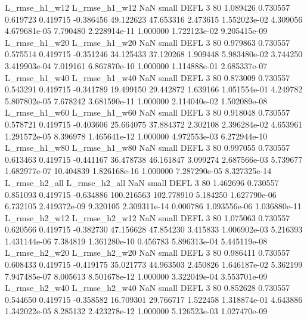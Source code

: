  L_rmse_h1_w12  L_rmse_h1_w12                   NaN      small     DEFL                 3 80 1.089426       0.730557 0.619723       0.419715   -0.386456     49.122623     47.653316     2.473615   1.552023e-02  4.309056 4.679681e-05     7.790480   2.228914e-11            1.000000    1.722123e-02        9.205415e-09
 L_rmse_h1_w20  L_rmse_h1_w20                   NaN      small     DEFL                 3 80 0.979863       0.730557 0.575514       0.419715   -0.351246     34.125433     37.120268     1.909448   5.983480e-02  3.744250 3.419903e-04     7.019161   6.867870e-10            1.000000    1.114888e-01        2.685337e-07
 L_rmse_h1_w40  L_rmse_h1_w40                   NaN      small     DEFL                 3 80 0.873009       0.730557 0.543291       0.419715   -0.341789     19.499150     29.442872     1.639166   1.051554e-01  4.249782 5.807802e-05     7.678242   3.681590e-11            1.000000    2.114040e-02        1.502089e-08
 L_rmse_h1_w60  L_rmse_h1_w60                   NaN      small     DEFL                 3 80 0.918048       0.730557 0.578721       0.419715   -0.403606     25.664075     37.884372     2.302108   2.396284e-02  4.653961 1.291572e-05     8.396978   1.465641e-12            1.000000    4.972553e-03        6.272944e-10
 L_rmse_h1_w80  L_rmse_h1_w80                   NaN      small     DEFL                 3 80 0.997055       0.730557 0.613463       0.419715   -0.441167     36.478738     46.161847     3.099274   2.687566e-03  5.739677 1.682977e-07    10.404839   1.826168e-16            1.000000    7.287290e-05        8.327325e-14
 L_rmse_h2_all  L_rmse_h2_all                   NaN      small     DEFL                 3 80 1.462696       0.730557 0.851093       0.419715   -0.634886    100.216563    102.778910     5.184250   1.627790e-06  6.732105 2.419372e-09     9.320105   2.309311e-14            0.000786    1.093556e-06        1.036880e-11
 L_rmse_h2_w12  L_rmse_h2_w12                   NaN      small     DEFL                 3 80 1.075063       0.730557 0.620566       0.419715   -0.382730     47.156628     47.854230     3.415833   1.006902e-03  5.216393 1.431144e-06     7.384819   1.361280e-10            0.456783    5.896313e-04        5.445119e-08
 L_rmse_h2_w20  L_rmse_h2_w20                   NaN      small     DEFL                 3 80 0.986411       0.730557 0.608433       0.419715   -0.419175     35.021773     44.963503     2.450826   1.646187e-02  5.362199 7.947485e-07     8.005613   8.501678e-12            1.000000    3.322049e-04        3.553701e-09
 L_rmse_h2_w40  L_rmse_h2_w40                   NaN      small     DEFL                 3 80 0.852628       0.730557 0.544650       0.419715   -0.358582     16.709301     29.766717     1.522458   1.318874e-01  4.643886 1.342022e-05     8.285132   2.423278e-12            1.000000    5.126523e-03        1.027470e-09
